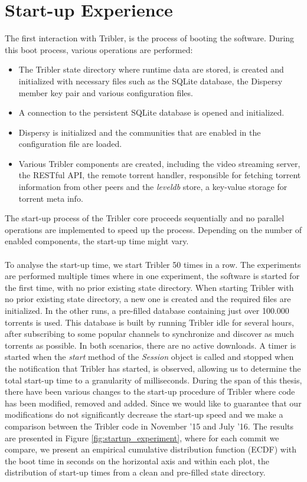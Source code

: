 \section{Start-up Experience}
The first interaction with Tribler, is the process of booting the software. During this boot process, various operations are performed:
\begin{itemize}
	\item The Tribler state directory where runtime data are stored, is created and initialized with necessary files such as the SQLite database, the Dispersy member key pair and various configuration files.
	\item A connection to the persistent SQLite database is opened and initialized.
	\item Dispersy is initialized and the communities that are enabled in the configuration file are loaded.
	\item Various Tribler components are created, including the video streaming server, the RESTful API, the remote torrent handler, responsible for fetching torrent information from other peers and the \emph{leveldb} store, a key-value storage for torrent meta info.
\end{itemize}
The start-up process of the Tribler core proceeds sequentially and no parallel operations are implemented to speed up the process. Depending on the number of enabled components, the start-up time might vary.\\\\
To analyse the start-up time, we start Tribler 50 times in a row. The experiments are performed multiple times where in one experiment, the software is started for the first time, with no prior existing state directory. When starting Tribler with no prior existing state directory, a new one is created and the required files are initialized. In the other runs, a pre-filled database containing just over 100.000 torrents is used. This database is built by running Tribler idle for several hours, after subscribing to some popular channels to synchronize and discover as much torrents as possible. In both scenarios, there are no active downloads. A timer is started when the \emph{start} method of the \emph{Session} object is called and stopped when the notification that Tribler has started, is observed, allowing us to determine the total start-up time to a granularity of milliseconds. During the span of this thesis, there have been various changes to the start-up procedure of Tribler where code has been modified, removed and added. Since we would like to guarantee that our modifications do not significantly decrease the start-up speed and we make a comparison between the Tribler code in November '15 and July '16. The results are presented in Figure \ref{fig:startup_experiment}, where for each commit we compare, we present an empirical cumulative distribution function (ECDF) with the boot time in seconds on the horizontal axis and within each plot, the distribution of start-up times from a clean and pre-filled state directory.\\

